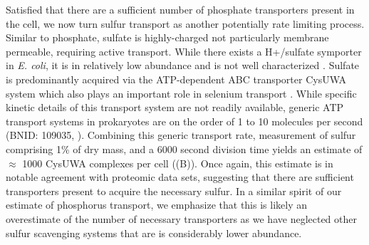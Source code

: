 Satisfied that there are a sufficient number of phosphate transporters
present in the cell, we now turn sulfur transport as another potentially rate
limiting process. Similar to phosphate, sulfate is highly-charged
not particularly membrane permeable, requiring active
transport. While there exists a H+/sulfate symporter in \textit{E.
coli}, it is in relatively low abundance and is not well characterized
\citep{zhang2014}. Sulfate is predominantly acquired via the ATP-dependent ABC
transporter CysUWA system which also plays an important role in selenium
transport \citep{sekowska2000, sirko1995}. While specific kinetic details of
this transport system are not readily available, generic ATP transport
systems in prokaryotes are on the order of 1 to 10 molecules per second
(BNID: 109035, \cite{milo2010}). Combining this generic
transport rate, measurement of sulfur comprising 1\% of dry mass, and a 6000
second division time yields an estimate of $\approx$ 1000 CysUWA
complexes per cell ((B)). Once again, this estimate
is in notable agreement with proteomic data sets, suggesting that there are
sufficient transporters present to acquire the necessary sulfur. In a similar
spirit of our estimate of phosphorus transport, we emphasize that this is
likely an overestimate of the number of necessary transporters as we have
neglected other sulfur scavenging systems that are is considerably lower
abundance.


\begin{figure}
    \begin{fullwidth}
    \end{fullwidth}
\end{figure}

